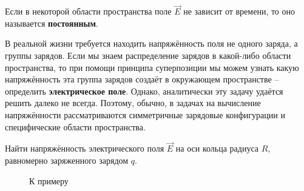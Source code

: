     \begin{definition}
        Если в некоторой области пространства поле \(\vec{E}\) не зависит от 
        времени, то оно называется \textbf{постоянным}.
    \end{definition}

    В реальной жизни требуется находить напряжённость поля не одного заряда, а 
    группы зарядов. Если мы знаем распределение зарядов в какой-либо области 
    пространства, то при помощи принципа суперпозиции  мы можем узнать какую 
    напряжённость эта группа зарядов создаёт в окружающем пространстве -- 
    определить \textbf{электрическое поле}. Однако, аналитически эту задачу 
    удаётся решить далеко не всегда. Поэтому, обычно, в задачах на вычисление 
    напряжённости рассматриваются симметричные зарядовые конфигурации и 
    специфические области пространства.

    \begin{example}
        Найти напряжённость электрического поля \( \vec{E} \) на оси кольца 
        радиуса \( R \), равномерно заряженного зарядом \( q \).
    \end{example}

    \begin{figure}[b]
        \center
        \hfill
        \caption{К примеру}
    \end{figure}

